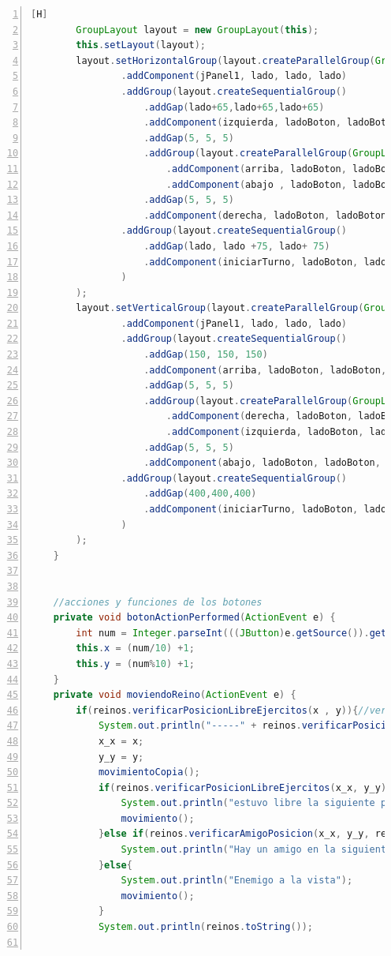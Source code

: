 \documentclass{article}
\begin{document}
\begin{lstlisting}[language=Java,caption={Creando la interfaz de tablero},numbers=left,][H]
        GroupLayout layout = new GroupLayout(this);
        this.setLayout(layout);
        layout.setHorizontalGroup(layout.createParallelGroup(GroupLayout.Alignment.LEADING)
                .addComponent(jPanel1, lado, lado, lado)
                .addGroup(layout.createSequentialGroup()
                    .addGap(lado+65,lado+65,lado+65)
                    .addComponent(izquierda, ladoBoton, ladoBoton, ladoBoton)
                    .addGap(5, 5, 5)
                    .addGroup(layout.createParallelGroup(GroupLayout.Alignment.TRAILING)
                        .addComponent(arriba, ladoBoton, ladoBoton, ladoBoton)
                        .addComponent(abajo , ladoBoton, ladoBoton, ladoBoton)) 
                    .addGap(5, 5, 5)
                    .addComponent(derecha, ladoBoton, ladoBoton, ladoBoton))
                .addGroup(layout.createSequentialGroup()
                    .addGap(lado, lado +75, lado+ 75)
                    .addComponent(iniciarTurno, ladoBoton, ladoBoton + 100, ladoBoton+100)
                )
        );
        layout.setVerticalGroup(layout.createParallelGroup(GroupLayout.Alignment.LEADING)
                .addComponent(jPanel1, lado, lado, lado)
                .addGroup(layout.createSequentialGroup()
                    .addGap(150, 150, 150)
                    .addComponent(arriba, ladoBoton, ladoBoton, ladoBoton)
                    .addGap(5, 5, 5)
                    .addGroup(layout.createParallelGroup(GroupLayout.Alignment.TRAILING)
                        .addComponent(derecha, ladoBoton, ladoBoton, ladoBoton)
                        .addComponent(izquierda, ladoBoton, ladoBoton, ladoBoton))
                    .addGap(5, 5, 5)
                    .addComponent(abajo, ladoBoton, ladoBoton, ladoBoton))
                .addGroup(layout.createSequentialGroup()
                    .addGap(400,400,400)
                    .addComponent(iniciarTurno, ladoBoton, ladoBoton, ladoBoton)      
                )
        );
    }


    //acciones y funciones de los botones
    private void botonActionPerformed(ActionEvent e) {
        int num = Integer.parseInt(((JButton)e.getSource()).getName());
        this.x = (num/10) +1;
        this.y = (num%10) +1;
    }
    private void moviendoReino(ActionEvent e) {
        if(reinos.verificarPosicionLibreEjercitos(x , y)){//veridficar si la casilla que presiono tiene un ejercito
            System.out.println("-----" + reinos.verificarPosicionLibreEjercitos(x, y));
            x_x = x;
            y_y = y;
            movimientoCopia();
            if(reinos.verificarPosicionLibreEjercitos(x_x, y_y)){
                System.out.println("estuvo libre la siguiente posicion");
                movimiento();
            }else if(reinos.verificarAmigoPosicion(x_x, y_y, reinos.getReinos().get(reinos.buscarEjercito(x_x,y_y)))){
                System.out.println("Hay un amigo en la siguiente posicion");
            }else{
                System.out.println("Enemigo a la vista");
                movimiento();
            }
            System.out.println(reinos.toString());


\end{lstlisting}
\end{document}
